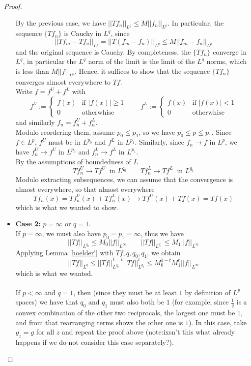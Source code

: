 \begin{proof}
\begin{itemize}
{\begin{itemize}
{            By the previous case, we have $||Tf_n||_{L^q} \leq M ||f_n||_{L^p}$. In particular, the sequence $\{Tf_n\}$ is Cauchy in $L^q$, since
            \[ ||Tf_m - Tf_n||_{L^q} = ||T(f_m-f_n)||_{L^q} \leq M ||f_m - f_n||_{L^p} \]
            and the original sequence is Cauchy. By completeness, the $\{Tf_n\}$ converge in $L^q$, in particular the $L^q$ norm of the limit is the limit of the $L^q$ norms, which is less than $M ||f||_{L^p}$.
            Hence, it suffices to show that the sequence $\{Tf_n\}$ converges almost everywhere to $Tf$.\\
            Write $f= f^U + f^L$ with
            \[ f^U := \begin{cases} f(x) & \text{if } |f(x)|\geq 1 \\ 0 & \text{otherwhise} \end{cases} \qquad f^L := \begin{cases} f(x) & \text{if } |f(x)|< 1 \\ 0 & \text{otherwhise} \end{cases}  \]
            and similarly $f_n = f_n^U + f_n^L$.\\
            Modulo reordering them, assume $p_0 \leq p_1$, so we have $p_0 \leq p \leq p_1$. Since $f\in L^p$, $f^U$ must be in $L^{p_0}$ and $f^L$ in $L^{p_1}$.
            Similarly, since $f_n \to f$ in $L^p$, we have $f_n^U \to f^U$ in $L^{p_0}$ and $f_n^L \to f^L$ in $L^{p_1}$.\\
            By the assumptions of boundedness of $L$
            \[ Tf_n^U \to Tf^U \ \text{ in } L^{q_0} \qquad Tf_n^L \to Tf^L \ \text{ in } L^{q_1} \]
            Modulo extracting subsequences, we can assume that the convergence is almost everywhere, so that almost everywhere
            \[ Tf_n (x) = Tf_n^U (x) + Tf_n^L(x) \to Tf^U (x) + Tf(x) = Tf (x)\]
            which is what we wanted to show.
            }
        \end{itemize}
        }
        \item{\textbf{Case 2:} $p=\infty$ or $q=1$.\\
        If $p=\infty$, we must also have $p_0=p_1=\infty$, thus we have
        \[ ||Tf||_{L^{q_0}} \leq M_0 ||f||_{L^{\infty}} \qquad ||Tf||_{L^{q_1}} \leq M_1 ||f||_{L^{\infty}} \]
        Applying Lemma \ref{hoelder'} with $Tf, q, q_0, q_1$, we obtain
        \[||Tf||_{L^q} \leq ||Tf||_{L^{q_0}}^{1-t} ||Tf||_{L^{q_1}}^{t} \leq  M_0^{1-t} M_1^t ||f||_{L^{\infty}} \]
        which is what we wanted.\\\\
        If $p<\infty$ and $q=1$, then (since they must be at least $1$ by definition of $L^p$ spaces) we have that $q_0$ and $q_1$ must also both be $1$ (for example, since $\frac{1}{q}$ is a convex combination of the other two reciprocals, the largest one must be $1$, and from that rearranging terms shows the other one is $1$).
        In this case, take $g_z=g$ for all $z$ and repeat the proof above (note:ixsn't this what already happens if we do not consider this case separately?).
        }

      \end{itemize}


  \end{proof}

